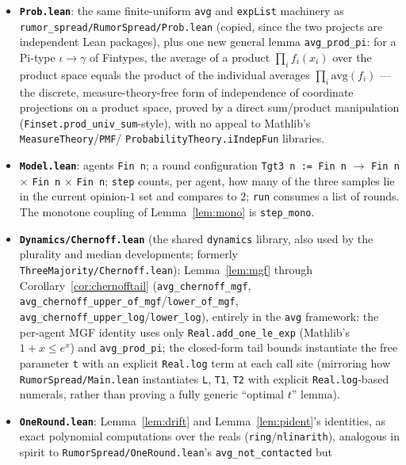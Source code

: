 \documentclass[11pt]{article}
\begin{document}
\begin{itemize}[leftmargin=2em]
\item \textbf{\texttt{Prob.lean}}: the same finite-uniform \texttt{avg} and
  \texttt{expList} machinery as \texttt{rumor\_spread/RumorSpread/Prob.lean}
  (copied, since the two projects are independent Lean packages), plus one
  new general lemma \texttt{avg\_prod\_pi}: for a Pi-type $\iota \to \gamma$
  of Fintypes, the average of a product $\prod_i f_i(x_i)$ over the product
  space equals the product of the individual averages $\prod_i
  \mathrm{avg}(f_i)$ — the discrete, measure-theory-free form of
  independence of coordinate projections on a product space, proved by a
  direct sum/product manipulation (\texttt{Finset.prod\_univ\_sum}-style),
  with no appeal to Mathlib's \texttt{MeasureTheory}/\texttt{PMF}/
  \texttt{ProbabilityTheory.iIndepFun} libraries.
\item \textbf{\texttt{Model.lean}}: agents \texttt{Fin n}; a round
  configuration \texttt{Tgt3 n := Fin n} $\to$ \texttt{Fin n} $\times$
  \texttt{Fin n} $\times$ \texttt{Fin n}; \texttt{step} counts, per agent,
  how many of the three samples lie in the current opinion-$1$ set and
  compares to $2$; \texttt{run} consumes a list of rounds. The monotone
  coupling of Lemma~\ref{lem:mono} is \texttt{step\_mono}.
\item \textbf{\texttt{Dynamics/Chernoff.lean}} (the shared \texttt{dynamics}
  library, also used by the plurality and median developments; formerly
  \texttt{ThreeMajority/Chernoff.lean}): Lemma~\ref{lem:mgf} through
  Corollary~\ref{cor:chernofftail} (\texttt{avg\_chernoff\_mgf},
  \texttt{avg\_chernoff\_upper\_of\_mgf}/\texttt{lower\_of\_mgf},
  \texttt{avg\_chernoff\_upper\_log}/\texttt{lower\_log}), entirely in the
  \texttt{avg} framework:
  the per-agent MGF identity uses only \texttt{Real.add\_one\_le\_exp}
  (Mathlib's $1+x\le e^x$) and \texttt{avg\_prod\_pi}; the closed-form tail
  bounds instantiate the free parameter \texttt{t} with an explicit
  \texttt{Real.log} term at each call site (mirroring how
  \texttt{RumorSpread/Main.lean} instantiates \texttt{L}, \texttt{T1},
  \texttt{T2} with explicit \texttt{Real.log}-based numerals, rather than
  proving a fully generic ``optimal $t$'' lemma).
\item \textbf{\texttt{OneRound.lean}}: Lemma~\ref{lem:drift} and
  Lemma~\ref{lem:pident}'s identities, as exact polynomial computations
  over the reals (\texttt{ring}/\texttt{nlinarith}), analogous in spirit to
  \texttt{RumorSpread/OneRound.lean}'s \texttt{avg\_not\_contacted} but

\end{itemize}
\end{document}
